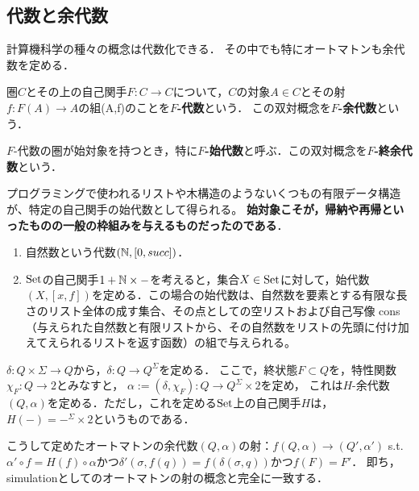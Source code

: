 \documentclass[uplatex, dvipdfmx]{jsreport}
\begin{document}
\subsection{代数と余代数}

\begin{screen}
    計算機科学の種々の概念は代数化できる．
    その中でも特にオートマトンも余代数を定める．
\end{screen}

\begin{definition}[$F$-代数]
    圏$C$とその上の自己関手$F:C\to C$について，$C$の対象$A\in C$とその射$f:F(A)\to A$の組(A,f)のことを\textbf{$F$-代数}という．
    この双対概念を\textbf{$F$-余代数}という．

    $F$-代数の圏が始対象を持つとき，特に\textbf{$F$-始代数}と呼ぶ．この双対概念を\textbf{$F$-終余代数}という．
\end{definition}
\begin{example}[始代数の例]
    プログラミングで使われるリストや木構造のようないくつもの有限データ構造が、特定の自己関手の始代数として得られる。
    \textbf{始対象こそが，帰納や再帰といったものの一般の枠組みを与えるものだったのである}．
    \begin{enumerate}
        \item 自然数という代数$(\mathbb{N},[0,succ])$．
        \item $\mathrm{Set}$の自己関手$1+\mathbb{N}\times-$を考えると，集合$X\in \mathrm{Set}$に対して，始代数$(X,[x,f])$を定める．この場合の始代数は、自然数を要素とする有限な長さのリスト全体の成す集合、その点としての空リストおよび自己写像 cons（与えられた自然数と有限リストから、その自然数をリストの先頭に付け加えてえられるリストを返す函数）の組で与えられる。
    \end{enumerate}
\end{example}

\begin{definition}[遷移関数のcurrying]
    $\delta:Q\times\Sigma\to Q$から，$\delta:Q\to Q^\Sigma$を定める．
    ここで，終状態$F\subset Q$を，特性関数$\chi_F:Q\to 2$とみなすと，
    $\alpha:=(\delta,\chi_F):Q\to Q^\Sigma\times 2$を定め，
    これは$H$-余代数$(Q,\alpha)$を定める．ただし，これを定める$\mathrm{Set}$上の自己関手$H$は，$H(-)=-^\Sigma\times 2$というものである．
\end{definition}
\begin{remark}
    こうして定めたオートマトンの余代数$(Q,\alpha)$の射：$f(Q,\alpha)\to(Q',\alpha')$ s.t. $\alpha'\circ f=H(f)\circ\alpha$かつ$\delta'(\sigma,f(q))=f(\delta(\sigma,q))$かつ$f(F)=F'$．
    即ち，simulationとしてのオートマトンの射の概念と完全に一致する．
\end{remark}
\end{document}
